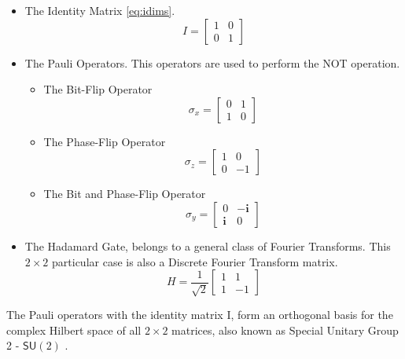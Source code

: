 \begin{itemize}
\item The Identity Matrix \eqref{eq:idims}.
\begin{equation}
\label{eq:idims}
I=\left[\begin{array}{cc}
1 & 0\\
0 & 1
\end{array}\right]
\end{equation}

\item The Pauli Operators. This operators are used to perform the NOT operation. 
	\begin{itemize}
		\item The Bit-Flip Operator\begin{equation}
\label{eq:idims_1}
\sigma_{x} =\left[\begin{array}{cc}
0 & 1\\
1 & 0
\end{array}\right]
\end{equation}
		\item The Phase-Flip Operator\begin{equation}
\label{eq:idims_2}
\sigma_{z} =\left[\begin{array}{cc}
1 & 0\\
0 & -1
\end{array}\right]
\end{equation}
\item The Bit and Phase-Flip Operator\begin{equation}
\label{eq:idims_3}
\sigma_{y}=\left[\begin{array}{cc}
0 & -\mathbf{i}\\
\mathbf{i} & 0
\end{array}\right]
\end{equation}
	\end{itemize}
\item The Hadamard Gate, belongs to a general class of Fourier Transforms. This $2\times 2$ particular case is also a Discrete Fourier Transform matrix.
\begin{equation}
\label{eq:idimssd_3}
H=\frac{1}{\sqrt{2}}\left[\begin{array}{cc}
1 & 1\\
1 & -1
\end{array}\right]
\end{equation}
\end{itemize}

The Pauli operators with the identity matrix I, form an orthogonal basis for the complex Hilbert space of all $2 \times 2$ matrices, also known as Special Unitary Group 2 - $\mathsf{SU}(2)$ \cite{Letters2002}.


